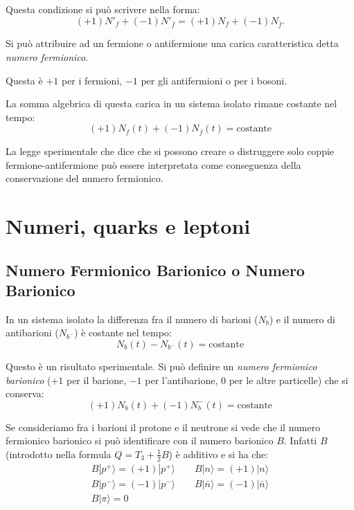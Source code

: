 Questa condizione si può scrivere nella forma:
\begin{equation*}
 (+1)N'_f + (-1)N'_{\bar{f}} = (+1)N_f + (-1)N_{\bar{f}}.
\end{equation*}


Si può attribuire ad un fermione o antifermione una carica caratteristica 
detta \emph{numero fermionico}.

Questa è $+1$ per i fermioni, $-1$ per gli antifermioni o per i bosoni.

La somma algebrica di questa carica in un sistema isolato rimane costante nel 
tempo:
\begin{equation*}
 (+1)N_f(t) + (-1)N_{\bar{f}}(t) = \text{costante}
\end{equation*}

La legge sperimentale che dice che si possono creare o distruggere solo coppie 
fermione-antifermione può essere interpretata
come conseguenza della conservazione del numero fermionico.
\chapter{Numeri, quarks e leptoni}
\section{Numero Fermionico Barionico o Numero Barionico}
In un sistema isolato la differenza fra il numero di barioni ($N_b$) e il 
numero di antibarioni ($N_{b^-}$) è costante nel tempo:
\[
N_b(t)-N_{b^-}(t)=\text{costante}
\]

Questo è un risultato sperimentale. Si può definire un \textit{numero 
fermionico barionico} ($+1$ per il barione,
$-1$ per l'antibarione, $0$ per le altre particelle) che si conserva:
\begin{equation}
(+1)N_b(t)+(-1)N_b^-(t)=\text{costante}
\end{equation}

Se consideriamo fra i barioni il protone e il neutrone si vede che il numero 
fermionico barionico si può
identificare con il numero barionico $B$. Infatti $B$ (introdotto nella formula 
$Q=T_3+\frac{1}{2}B$) è additivo e
si ha che:
\begin{gather}
B|p^+\rangle =(+1)|p^+\rangle\qquad B|n\rangle =(+1)|n\rangle\\
B|p^-\rangle =(-1)|p^-\rangle\qquad B|\bar{n}\rangle =(-1)|\bar{n}\rangle\\
B|\pi\rangle =0
\end{gather}

